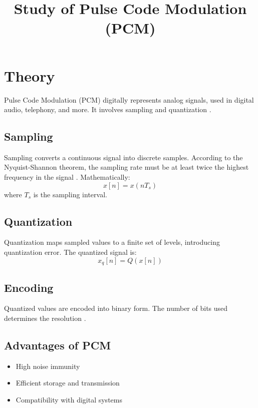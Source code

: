 \documentclass[12pt]{article}
\title{Study of Pulse Code Modulation (PCM)}
\author{}
\date{}
\begin{document}


\pagebreak

\tableofcontents

\pagebreak
{}
\maketitle

\section*{Theory}
Pulse Code Modulation (PCM) digitally represents analog signals, used in digital audio, telephony, and more. It involves sampling and quantization \cite{oppenheim1996signals}.

\subsection*{Sampling}
Sampling converts a continuous signal into discrete samples. According to the Nyquist-Shannon theorem, the sampling rate must be at least twice the highest frequency in the signal \cite{shannon1949communication}. Mathematically:
\[
    x[n] = x(nT_s)
\]
where \( T_s \) is the sampling interval.

\subsection*{Quantization}
Quantization maps sampled values to a finite set of levels, introducing quantization error. The quantized signal is:
\[
    x_q[n] = Q(x[n])
\]

\subsection*{Encoding}
Quantized values are encoded into binary form. The number of bits used determines the resolution \cite{proakis2007digital}.

\subsection*{Advantages of PCM}
\begin{itemize}
    \item High noise immunity
    \item Efficient storage and transmission
    \item Compatibility with digital systems
\end{itemize}
\end{document}
